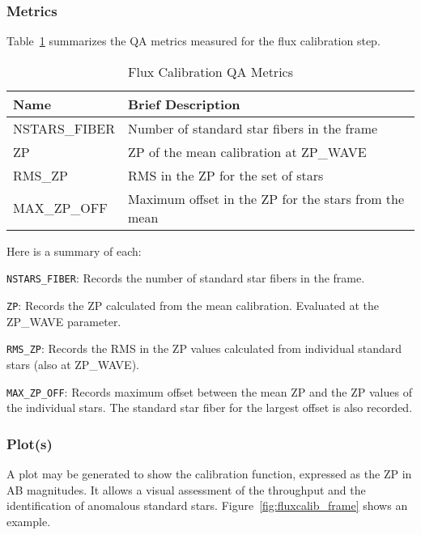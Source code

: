 \documentclass[12pt]{article}
\begin{document}
\subsubsection{Metrics}

Table~\ref{tab:flux_metrics} summarizes the QA metrics measured
for the flux calibration step. 

\begin{table}[h]
\begin{center}
\caption{Flux Calibration QA Metrics}
\label{tab:flux_metrics}
\begin{tabular}{p{4.3cm}p{9.0cm}}
\hline
{\bf Name} & {\bf Brief Description}\\
\hline
NSTARS\_FIBER         & Number of standard star fibers in the frame \\
ZP                    & ZP of the mean calibration at ZP\_WAVE \\
RMS\_ZP               & RMS in the ZP for the set of stars\\
MAX\_ZP\_OFF          & Maximum offset in the ZP for the stars from the mean \\
\hline
\end{tabular}
\end{center}
\end{table}

\noindent
Here is a summary of each:

\vskip 0.2in

\noindent
{\tt NSTARS\_FIBER}:  Records the number of standard star fibers in the frame.

\noindent
{\tt ZP}:  Records the ZP calculated from the mean calibration.
Evaluated at the ZP\_WAVE parameter.

\noindent
{\tt RMS\_ZP}:  Records the RMS in the ZP values calculated from individual
standard stars (also at ZP\_WAVE).

\noindent
{\tt MAX\_ZP\_OFF}:  Records maximum offset between the mean ZP and the ZP
values of the individual stars.  The standard star 
fiber for the largest offset is also recorded.

\subsubsection{Plot(s)}

A plot may be generated to show the calibration function,
expressed as the ZP in AB magnitudes.
It allows a visual assessment of the throughput
and the identification of anomalous standard stars.
Figure~\ref{fig:fluxcalib_frame} shows an example.
\end{document}
